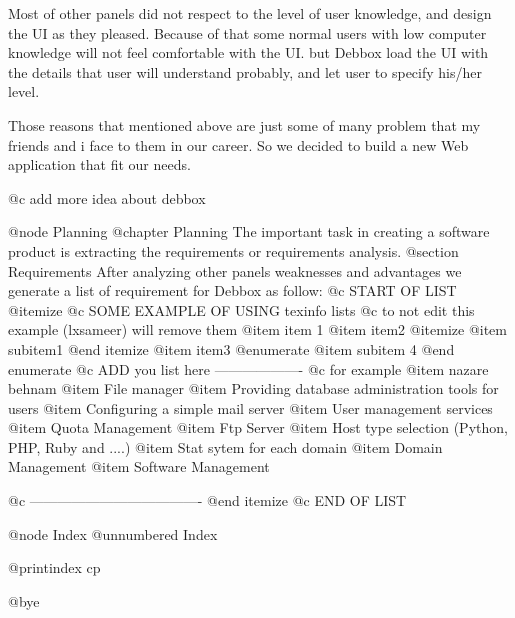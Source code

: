 Most of other panels did not respect to the level of user knowledge, and design the UI as they pleased. Because of that
some normal users with low computer knowledge will not feel comfortable with the UI. but Debbox load the UI with the details
 that user will understand probably, and let user to specify his/her level.

Those reasons that mentioned above are just some of many problem that my friends and i face to them in our career. So
we decided to build a new Web application that fit our needs.


@c add more idea about debbox       

@node Planning
@chapter Planning
The important task in creating a software product is extracting the requirements or requirements analysis. 
@section Requirements
After analyzing other panels weaknesses and advantages we generate a list of requirement for Debbox as follow:
@c START OF LIST
@itemize
@c SOME EXAMPLE OF USING texinfo lists
@c to not edit this example (lxsameer) will remove them
@item
item 1
@item
item2
@itemize
@item 
subitem1
@end itemize
@item
item3
@enumerate 
@item
subitem 4
@end enumerate
@c ADD you list here -------------------
@c for example
@item
nazare behnam
@item
File manager
@item
Providing database administration tools for users
@item
Configuring a simple mail server 
@item
User management services
@item
Quota Management
@item
Ftp Server
@item
Host type selection (Python, PHP, Ruby and ....)
@item
Stat sytem for each domain
@item
Domain Management
@item
Software Management 

@c -------------------------------------
@end itemize
@c END OF LIST

@node Index
@unnumbered Index

@printindex cp

@bye
